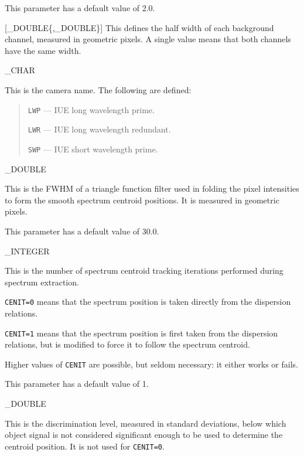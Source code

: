 {{   This parameter has a default value of 2.0.
}

{
   [\_DOUBLE\{,\_DOUBLE\}]
}{
   This defines the half width of each background channel, measured
   in geometric pixels.
   A single value means that both channels have the same width.
}

{
   \_CHAR
}{
   This is the camera name.
   The following are defined:

   \begin {quote}
   \begin {description}
      \item {\tt LWP} --- IUE long wavelength prime.
      \item {\tt LWR} --- IUE long wavelength redundant.
      \item {\tt SWP} --- IUE short wavelength prime.
   \end {description}
   \end {quote}
}

{
   \_DOUBLE
}{
   This is the FWHM of a triangle function filter used in folding the
   pixel intensities to form the smooth spectrum centroid positions.
   It is measured in geometric pixels.

   This parameter has a default value of 30.0.
}

{
   \_INTEGER
}{
   This is the number of spectrum centroid tracking iterations performed during
   spectrum extraction.

   \begin {description}
      \item \verb+CENIT=0+ means that the spectrum position is taken directly
      from the dispersion relations.

      \item \verb+CENIT=1+ means that the spectrum position is first taken
      from the dispersion relations, but is modified to force it to
      follow the spectrum centroid.
   \end {description}

   Higher values of \verb+CENIT+ are possible, but seldom necessary:  it either
   works or fails.

   This parameter has a default value of 1.
}

{
   \_DOUBLE
}{
   This is the discrimination level, measured in standard deviations,
   below which object signal is not considered significant enough
   to be used to determine the centroid position.
   It is not used for \verb+CENIT=0+\@.

}}
